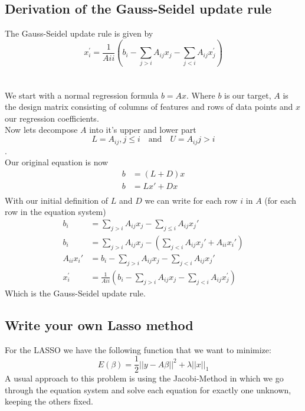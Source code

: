 \documentclass[a4paper, 11pt]{article}
\begin{document}
\subsection*{Derivation of the Gauss-Seidel update rule}
The Gauss-Seidel update rule is given by 
  \begin{equation}
  x^{'}_i=\frac{1}{A{ii}}(b_i-\sum_{j>i}A_{ij}x_j-\sum_{j<i}A_{ij}x^{'}_j)
  \end{equation}
\\\\
We start with a normal regression formula $b = Ax$. Where $b$ is our target, $A$ is the design matrix consisting of columns of features and rows of data points and $x$ our regression coefficients.\\
Now lets decompose $A$ into it's upper and lower part \begin{equation}
L = A_{ij}, j\leq i \quad \textrm{and} \quad      U=A_{ij}j>i
\end{equation}.\\
Our original equation is now
\begin{equation}
\begin{split}
b & = (L+D)x \\
b & = Lx'+Dx\\
\end{split}
\end{equation}
With our initial definition of $L$ and $D$ we can write for each row $i$ in $A$ (for each row in the equation system) \\
\begin{equation}
\begin{split}
b_i & = \sum_{j>i}A_{ij}x_j - \sum_{j\leq i}A_{ij}x_j'\\
b_i & = \sum_{j>i}A_{ij}x_j - (\sum_{j<i}A_{ij}x_j' + A_{ii}x_i')\\
A_{ii}x_i' & = b_i -\sum_{j>i}A_{ij}x_j - \sum_{j<i}A_{ij}x_j'\\
 x^{'}_i &=\frac{1}{A{ii}}(b_i-\sum_{j>i}A_{ij}x_j-\sum_{j<i}A_{ij}x^{'}_j)
\end{split}
\end{equation}
Which is the Gauss-Seidel update rule.



\subsection*{Write your own Lasso method}
For the LASSO we have the following function that we want to minimize:
\begin{equation}
 E(\beta) = \frac{1}{2}||y-A\beta||^2+\lambda||x||_1
\end{equation}
A usual approach to this problem is using the Jacobi-Method in which we go through the equation system and solve each equation for exactly one unknown, keeping the others fixed.
\end{document}
